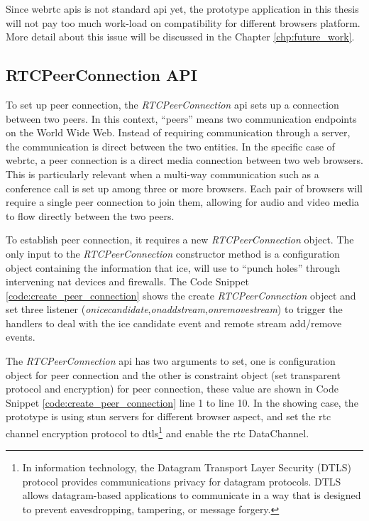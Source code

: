 \par Since \gls{webrtc} \gls{api}s is not standard \gls{api} yet, the prototype application in this thesis will not pay too much work-load on compatibility for different browsers platform. More detail about this issue will be discussed in the Chapter \ref{chp:future_work}.

\subsection{RTCPeerConnection API}

\noindent To set up peer connection, the \textit{RTCPeerConnection} \gls{api} sets up a connection between two peers. In this context, “peers” means two communication endpoints on the World Wide Web. Instead of requiring communication through a server, the communication is direct between the two entities. In the specific case of \gls{webrtc}, a peer connection is a direct media connection between two web browsers. This is particularly relevant when a multi-way communication such as a conference call is set up among three or more browsers. Each pair of browsers will require a single peer connection to join them, allowing for audio and video media to flow directly between the two peers. 

\par To establish peer connection, it requires a new \textit{RTCPeerConnection} object. The only input to the \textit{RTCPeerConnection} constructor method is a configuration object containing the information that \gls{ice}, will use to “punch holes” through intervening \gls{nat} devices and firewalls. The Code Snippet \ref{code:create_peer_connection} shows the create \textit{RTCPeerConnection} object and set three listener (\textit{onicecandidate},\textit{onaddstream},\textit{onremovestream}) to trigger the handlers to deal with the \gls{ice} candidate event and remote stream add/remove events.

\par The \textit{RTCPeerConnection} \gls{api} has two arguments to set, one is configuration object for peer connection and the other is constraint object (set transparent protocol and encryption) for peer connection, these value are shown in Code Snippet \ref{code:create_peer_connection} line 1 to line 10. In the showing case, the prototype is using \gls{stun} servers for different browser aspect, and set the \gls{rtc} channel encryption protocol to \gls{dtls}\footnote{In information technology, the Datagram Transport Layer Security (DTLS) protocol provides communications privacy for datagram protocols. DTLS allows datagram-based applications to communicate in a way that is designed to prevent eavesdropping, tampering, or message forgery.\cite{wiki:dtls}} and enable the \gls{rtc} DataChannel.

